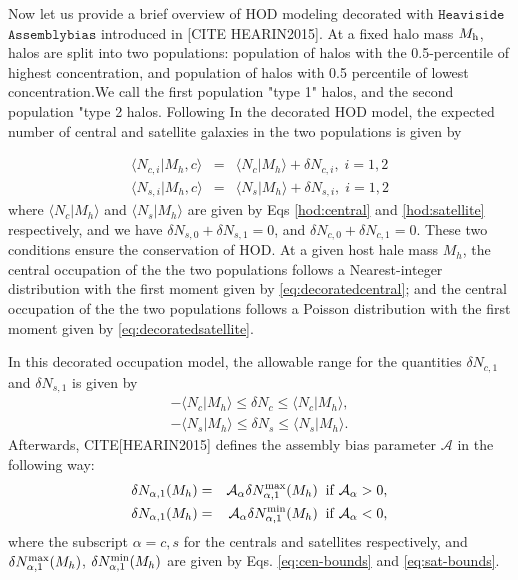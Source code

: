 \documentclass[12pt, preprint]{aastex}
\begin{document}
Now let us provide a brief overview of HOD modeling decorated with $\mathtt{Heaviside}$ $\mathtt{Assemblybias}$ introduced in [CITE HEARIN2015]. At a fixed halo mass $M_{\rm h}$, halos are split into two populations: population of halos with the 0.5-percentile of highest concentration, and population of halos with 0.5 percentile of lowest concentration.We call the first population "type 1" halos, and the second population "type 2 halos. Following In the decorated HOD model, the expected number of central and satellite galaxies in the two populations is given by

\begin{eqnarray}
\langle N_{c,i} | M_{h},c\rangle &=& \langle N_{c} | M_{h}\rangle + \delta N _{c,i}, \; i=1,2 \label{eq:decoratedcentral} \\
\langle N_{s,i} | M_{h},c\rangle &=& \langle N_{s} | M_{h}\rangle + \delta N _{s,i}, \; i=1,2 \label{eq:decoratedsatellite}
\end{eqnarray}
where $\langle N_{c} | M_{h}\rangle$ and $\langle N_{s} | M_{h}\rangle$ are given by Eqs \ref{hod:central} and \ref{hod:satellite} respectively, and we have $\delta N_{s,0} + \delta N_{s,1} = 0$, and $\delta N_{c,0} + \delta N_{c,1} = 0$. These two conditions ensure the conservation of HOD. At a given host hale mass $M_{h}$, the central occupation of the the two populations follows a Nearest-integer distribution with the first moment given by \ref{eq:decoratedcentral}; and the central occupation of the the two populations follows a Poisson distribution with the first moment given by \ref{eq:decoratedsatellite}. 

In this decorated occupation model, the allowable range for the quantities $\delta N_{c,1}$ and $\delta N_{s,1}$ is given by 
\begin{eqnarray}
-\langle N_{c} | M_{h}\rangle \leq \delta N_{c} \leq \langle N_{c} | M_{h}\rangle
 , \label{eq:cen-bounds} \\
-\langle N_{s} | M_{h}\rangle \leq \delta N_{s} \leq \langle N_{s} | M_{h}\rangle. \label{eq:sat-bounds}
\end{eqnarray}
Afterwards, CITE[HEARIN2015] defines the assembly bias parameter $\mathcal{A}$ in the following way:
\begin{eqnarray}
\delta N_{\alpha , 1}(M_{h}) &=& \mathcal{A_\alpha} \delta N_{\alpha , 1}^{\rm max}(M_{h}) \; \; \rm{if} \; \mathcal{A_\alpha} > 0,  \\
\delta N_{\alpha , 1}(M_{h}) &=& \mathcal{A_\alpha} \delta N_{\alpha , 1}^{\rm min}(M_{h}) \; \; \rm{if} \; \mathcal{A_\alpha} < 0,
\end{eqnarray}
where the subscript $\alpha = c , s$ for the centrals and satellites respectively, and $\delta N_{\alpha , 1}^{\rm max}(M_{h})$, $\delta N_{\alpha , 1}^{\rm min}(M_{h})$ are given by Eqs. \ref{eq:cen-bounds} and \ref{eq:sat-bounds}.  
\end{document}
